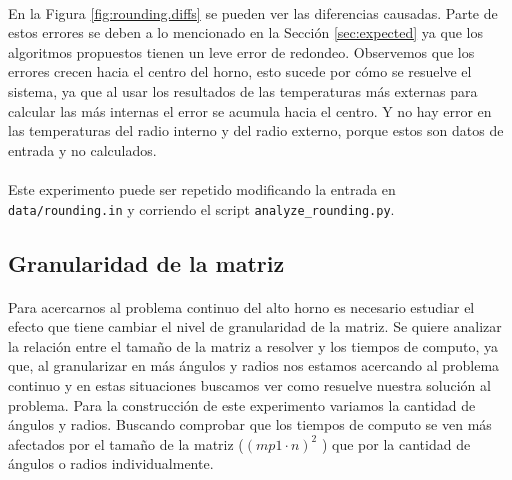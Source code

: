 \documentclass[12pt]{article}
\begin{document}
\paragraph{} En la Figura \ref{fig:rounding.diffs} se pueden ver las diferencias causadas. Parte de estos errores se deben a lo mencionado en la Sección \ref{sec:expected} ya que los algoritmos propuestos tienen un leve error de redondeo. Observemos que los errores crecen hacia el centro del horno, esto sucede por cómo se resuelve el sistema, ya que al usar los resultados de las temperaturas más externas para calcular las más internas el error se acumula hacia el centro. Y no hay error en las temperaturas del radio interno y del radio externo, porque estos son datos de entrada y no calculados.

\paragraph{} Este experimento puede ser repetido modificando la entrada en \texttt{data/rounding.in} y corriendo el script \texttt{analyze\_rounding.py}.


\subsection{Granularidad de la matriz}

\paragraph{} Para acercarnos al problema continuo del alto horno es necesario estudiar el efecto que tiene cambiar el nivel de granularidad de la matriz. Se quiere analizar la relación entre el tamaño de la matriz a resolver y los tiempos de computo, ya que, al granularizar en más ángulos y radios nos estamos acercando al problema continuo y en estas situaciones buscamos ver como resuelve nuestra solución al problema. Para la construcción de este experimento variamos la cantidad de ángulos y radios. Buscando comprobar que los tiempos de computo se ven más afectados por el tamaño de la matriz (\((mp1 \cdot n)^2\) ) que por la cantidad de ángulos o radios individualmente.
\end{document}
